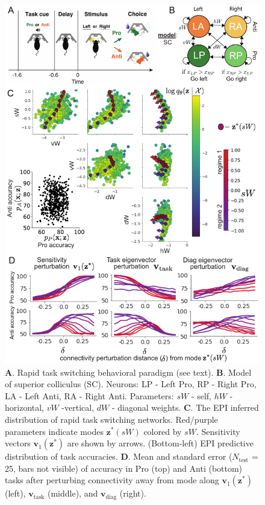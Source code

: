 \documentclass[11pt]{article}
\begin{document}
\begin{figure}
\begin{center}
\includegraphics[scale=0.75]{figures/fig4/fig4.pdf}
\end{center}
\vspace{-.25cm}
\caption{\small
\textbf{A}. Rapid task switching behavioral paradigm (see text). 
\textbf{B}. Model of superior colliculus (SC). Neurons: LP - Left Pro, RP - Right Pro, LA - Left Anti, RA - Right Anti. 
Parameters: $sW$ - self, $hW$ - horizontal, $vW$ -vertical, $dW$ - diagonal weights.  
\textbf{C}. The EPI inferred distribution of rapid task switching networks.  
Red/purple parameters indicate modes $\mathbf{z}^*(sW)$ colored by $sW$.
Sensitivity vectors $\mathbf{v}_1(\mathbf{z}^*)$ are shown by arrows.
(Bottom-left) EPI predictive distribution of task accuracies.
\textbf{D}. Mean and standard error ($N_{\text{test}}$ = 25, bars not visible) of accuracy in Pro (top) and Anti (bottom) tasks after perturbing connectivity away from mode along $\mathbf{v}_1(\mathbf{z}^*)$ (left), $\mathbf{v}_{\text{task}}$ (middle), and $\mathbf{v}_{\text{diag}}$ (right).
}
\label{fig:SC}
\end{figure}
\end{document}
